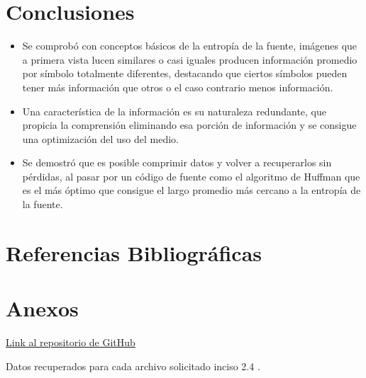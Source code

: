 \documentclass[conference,onecolumn,12pt]{IEEEtran}
\numberwithin{equation}{subsection}
\begin{document}
\section{Conclusiones} 

\begin{itemize}

\item Se comprobó con conceptos básicos de la entropía de la fuente, imágenes que a primera vista lucen similares o casi iguales producen información promedio por símbolo totalmente diferentes, destacando que ciertos símbolos pueden tener más información que otros o el caso contrario menos información. 
\item Una característica de la información es su naturaleza redundante, que propicia la comprensión eliminando esa porción de información y se consigue una optimización del uso del medio.
\item Se demostró que es posible comprimir datos y volver a recuperarlos sin pérdidas, al pasar por un código de fuente como el algoritmo de Huffman que es el más óptimo que consigue el largo promedio más cercano a la entropía de la fuente.


\end{itemize}


\section{Referencias Bibliográficas}
\printbibliography[heading=none]

\section{Anexos}
\href{https://github.com/NagelMS/Tarea2_CE2.git}{Link al repositorio de GitHub}



Datos recuperados para cada archivo solicitado inciso 2.4 .
\end{document}
